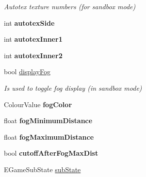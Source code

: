 \begin{DoxyCompactItemize}
\begin{DoxyCompactList}\small\item\em \-Autotex texture numbers (for sandbox mode) \end{DoxyCompactList}\item 
\hypertarget{classGame_a3923c163a378fa882c88248c8a0d0f18}{
int {\bfseries autotex\-Side}}
\label{d9/d68/classGame_a3923c163a378fa882c88248c8a0d0f18}

\item 
\hypertarget{classGame_a477ecea69410368303b2401ac04d9587}{
int {\bfseries autotex\-Inner1}}
\label{d9/d68/classGame_a477ecea69410368303b2401ac04d9587}

\item 
\hypertarget{classGame_a81244a66b583a8063ceaaf13c3c19d13}{
int {\bfseries autotex\-Inner2}}
\label{d9/d68/classGame_a81244a66b583a8063ceaaf13c3c19d13}

\item 
\hypertarget{classGame_a98fecd2025934091e8d5ee88fd3a3f0c}{
bool \hyperlink{classGame_a98fecd2025934091e8d5ee88fd3a3f0c}{display\-Fog}}
\label{d9/d68/classGame_a98fecd2025934091e8d5ee88fd3a3f0c}

\begin{DoxyCompactList}\small\item\em \-Is used to toggle fog display (in sandbox mode) \end{DoxyCompactList}\item 
\hypertarget{classGame_a09b099de772e762b7d30a6abd7db4219}{
\-Colour\-Value {\bfseries fog\-Color}}
\label{d9/d68/classGame_a09b099de772e762b7d30a6abd7db4219}

\item 
\hypertarget{classGame_a62c1db96c79890566f8d1a46c6e4f220}{
float {\bfseries fog\-Minimum\-Distance}}
\label{d9/d68/classGame_a62c1db96c79890566f8d1a46c6e4f220}

\item 
\hypertarget{classGame_a21e18dfe5ce5294f2937c5c8126d1afb}{
float {\bfseries fog\-Maximum\-Distance}}
\label{d9/d68/classGame_a21e18dfe5ce5294f2937c5c8126d1afb}

\item 
\hypertarget{classGame_a28bb2d14076de9bda1a195a3a9fa5130}{
bool {\bfseries cutoff\-After\-Fog\-Max\-Dist}}
\label{d9/d68/classGame_a28bb2d14076de9bda1a195a3a9fa5130}

\item 
\hypertarget{classGame_a114e62b3579e9e001600447a623a8ed4}{
\-E\-Game\-Sub\-State \hyperlink{classGame_a114e62b3579e9e001600447a623a8ed4}{sub\-State}}
\label{d9/d68/classGame_a114e62b3579e9e001600447a623a8ed4}


\end{DoxyCompactItemize}
